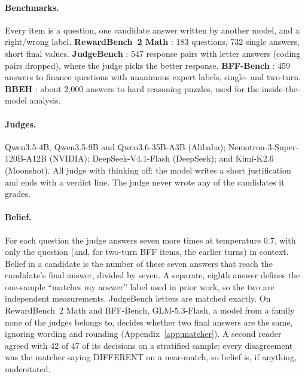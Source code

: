 \documentclass[11pt]{article}
\begin{document}
\paragraph{Benchmarks.}
Every item is a question, one candidate answer written by another model, and a right/wrong label.
\textbf{RewardBench~2 Math} \citep{malik2025rewardbench2}: 183 questions, 732 single answers, short final values.
\textbf{JudgeBench} \citep{tan2025judgebench}: 547 response pairs with letter answers (coding pairs dropped), where
the judge picks the better response. \textbf{BFF-Bench} \citep{krumdick2026nofreelabels}: 459 answers to
finance questions with unanimous expert labels, single- and two-turn. \textbf{BBEH}
\citep{kazemi-etal-2025-big}: about 2,000 answers to hard reasoning puzzles, used for the inside-the-model analysis.

\paragraph{Judges.}
Qwen3.5-4B, Qwen3.5-9B and Qwen3.6-35B-A3B (Alibaba); Nemotron-3-Super-120B-A12B (NVIDIA); DeepSeek-V4.1-Flash
(DeepSeek); and Kimi-K2.6 (Moonshot). All judge with thinking off: the model writes a short justification and
ends with a verdict line. The judge never wrote any of the candidates it grades.

\paragraph{Belief.}
For each question the judge answers seven more times at temperature 0.7, with only the question (and, for
two-turn BFF items, the earlier turns) in context. Belief in a candidate is the number of these seven answers that
reach the candidate's final answer, divided by seven. A separate, eighth answer defines the one-sample
``matches my answer'' label used in prior work, so the two are independent measurements. JudgeBench letters are
matched exactly. On RewardBench~2 Math and BFF-Bench, GLM-5.3-Flash, a model from a family none of the judges
belongs to, decides whether two final answers are the same, ignoring wording and rounding
(Appendix~\ref{app:matcher}). A second reader agreed with 42 of 47 of its decisions on a stratified sample; every
disagreement was the matcher saying DIFFERENT on a near-match, so belief is, if anything, understated.
\end{document}
